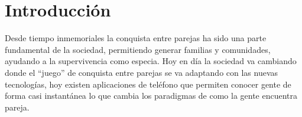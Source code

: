 

\newcommand{\x}{\ensuremath{\tilde{\mathbf{x}}}}
\def\rddots#1{\cdot^{\cdot^{\cdot^{#1}}}}







\section{Introducción}

Desde tiempo inmemoriales la conquista entre parejas ha sido una parte fundamental de la sociedad, permitiendo generar familias y comunidades, ayudando a la supervivencia como especia. Hoy en día la sociedad va cambiando donde el ``juego'' de conquista entre parejas se va adaptando con las nuevas tecnologías, hoy existen aplicaciones de teléfono que permiten conocer gente de forma casi instantánea lo que cambia los paradigmas de como la gente encuentra pareja.


